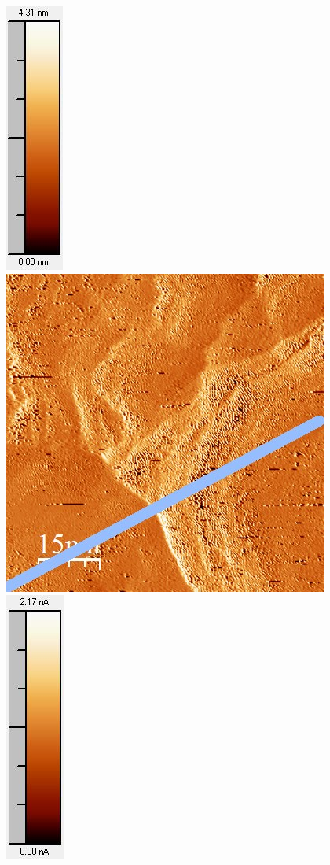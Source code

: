 \documentclass[12pt,a4paper]{article}
\begin{document}
\begin{figure}[H]
\includegraphics[scale=0.6]{Bilder/Anhang/Zeit/0_1_Zeit_nach_Skala.jpg}
\includegraphics[scale=0.6]{Bilder/Anhang/Zeit/Strom/0_1_Zeit_vor_Strom.jpg}
\includegraphics[scale=0.6]{Bilder/Anhang/Zeit/Strom/0_1_Zeit_vor_Strom_Skala.jpg}

\end{figure}
\end{document}
